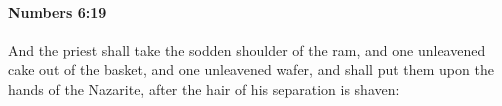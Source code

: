 
		\paragraph{Numbers 6:19} %
			\label{NUMBERS-6-19}

			And the priest shall take the sodden shoulder of the ram, and one unleavened cake out of the basket, and one unleavened wafer, and shall put them upon the hands of the Nazarite, after the hair of his separation is shaven:


